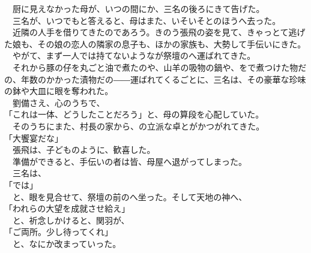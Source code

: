 \documentclass[
  paper=a5,
  fontsize=10pt,
  jafontsize=9.5pt,
  tate,                  %
  open_bracket_pos=nibu, %
]{jlreq}
\begin{document}
　厨に見えなかった母が、いつの間にか、三名の後ろにきて告げた。\\


　三名が、いつでもと答えると、母はまた、いそいそとのほうへ去った。\\


　近隣の人手を借りてきたのであろう。きのう張飛の姿を見て、きゃっとて逃げた娘も、その娘の恋人の隣家の息子も、ほかの家族も、大勢して手伝いにきた。\\


　やがて、まず一人では持てないようなが祭壇のへ運ばれてきた。\\


　それから豚の仔を丸ごと油で煮たのや、山羊の吸物の鍋や、をで煮つけた物だの、年数のかかった漬物だの――運ばれてくるごとに、三名は、その豪華な珍味の鉢や大皿に眼を奪われた。\\


　劉備さえ、心のうちで、\\


「これは一体、どうしたことだろう」と、母の算段を心配していた。\\


　そのうちにまた、村長の家から、の立派な卓とがかつがれてきた。\\


「大饗宴だな」\\


　張飛は、子どものように、歓喜した。\\


　準備ができると、手伝いの者は皆、母屋へ退がってしまった。\\


　三名は、\\


「では」\\


　と、眼を見合せて、祭壇の前のへ坐った。そして天地の神へ、\\


「われらの大望を成就させ給え」\\


　と、祈念しかけると、関羽が、\\


「ご両所。少し待ってくれ」\\


　と、なにか改まっていった。\\
\end{document}
